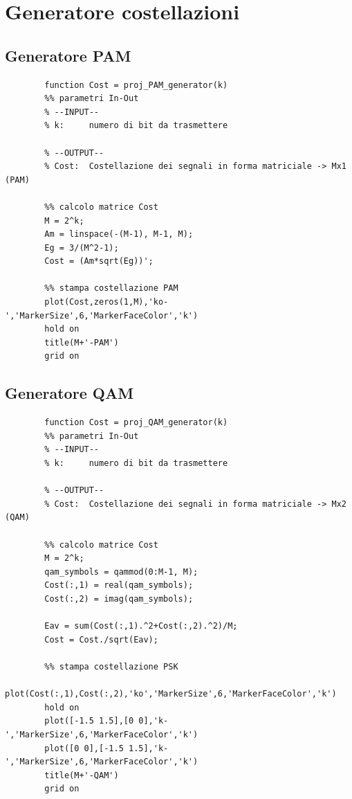 \documentclass[12pt, a4paper]{article}
\begin{document}
	\newpage
	\section{Generatore costellazioni}
	\subsection{Generatore PAM}
	\begin{lstlisting}
		function Cost = proj_PAM_generator(k)
		%% parametri In-Out
		% --INPUT--
		% k:     numero di bit da trasmettere
		
		% --OUTPUT--
		% Cost:  Costellazione dei segnali in forma matriciale -> Mx1 (PAM)
		
		%% calcolo matrice Cost
		M = 2^k;
		Am = linspace(-(M-1), M-1, M);
		Eg = 3/(M^2-1);
		Cost = (Am*sqrt(Eg))';
		
		%% stampa costellazione PAM
		plot(Cost,zeros(1,M),'ko-','MarkerSize',6,'MarkerFaceColor','k')
		hold on
		title(M+'-PAM')
		grid on
	\end{lstlisting}
	\subsection{Generatore QAM}
	\begin{lstlisting}
		function Cost = proj_QAM_generator(k)
		%% parametri In-Out
		% --INPUT--
		% k:     numero di bit da trasmettere
		
		% --OUTPUT--
		% Cost:  Costellazione dei segnali in forma matriciale -> Mx2 (QAM)
		
		%% calcolo matrice Cost
		M = 2^k;
		qam_symbols = qammod(0:M-1, M);
		Cost(:,1) = real(qam_symbols); 
		Cost(:,2) = imag(qam_symbols);
		
		Eav = sum(Cost(:,1).^2+Cost(:,2).^2)/M;
		Cost = Cost./sqrt(Eav);
		
		%% stampa costellazione PSK
		plot(Cost(:,1),Cost(:,2),'ko','MarkerSize',6,'MarkerFaceColor','k')
		hold on
		plot([-1.5 1.5],[0 0],'k-','MarkerSize',6,'MarkerFaceColor','k')
		plot([0 0],[-1.5 1.5],'k-','MarkerSize',6,'MarkerFaceColor','k')
		title(M+'-QAM')
		grid on
	\end{lstlisting}
	\newpage
\end{document}
